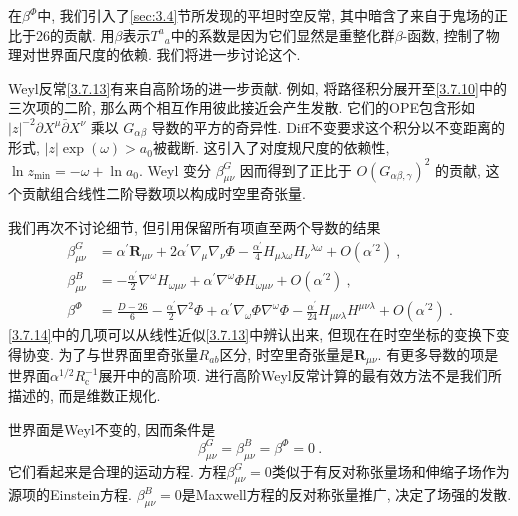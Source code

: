 在$\beta^{\Phi}$中,  我们引入了\ref{sec:3.4}节所发现的平坦时空反常, 其中暗含了来自于鬼场的正比于26的贡献. 用$\beta$表示$T^{a}{ }_{a}$中的系数是因为它们显然是重整化群$\beta$-函数, 控制了物理对世界面尺度的依赖. 我们将进一步讨论这个.

Weyl反常\eqref{3.7.13}有来自高阶场的进一步贡献. 例如, 将路径积分展开至\eqref{3.7.10}中的三次项的二阶, 那么两个相互作用彼此接近会产生发散. 
它们的OPE包含形如 $|z|^{-2} \partial X^{\mu} \bar{\partial} X^{\nu}$ 乘以 $G_{\alpha \beta} $ 导数的平方的奇异性.  Diff不变要求这个积分以不变距离的形式, $|z| \exp (\omega)>a_{0} $被截断. 这引入了对度规尺度的依赖性, $\ln z_{\min }=-\omega+\ln a_{0}$. Weyl 变分 $\beta_{\mu \nu}^{G}$
因而得到了正比于 $O(G_{\alpha \beta, \gamma})^{2}$ 的贡献, 这个贡献组合线性二阶导数项以构成时空里奇张量.

我们再次不讨论细节, 但引用保留所有项直至两个导数的结果
\begin{subequations}\label{3.7.14}
\begin{align}
\beta_{\mu \nu}^{G}&=\alpha^{\prime} \bm{R}_{\mu \nu}+2 \alpha^{\prime} \nabla_{\mu} \nabla_{\nu} \Phi-\frac{\alpha^{\prime}}{4} H_{\mu \lambda \omega} H_{\nu}{}^{\lambda \omega}+O(\alpha^{\prime 2}) \:, \label{3.7.14a} \\
\beta_{\mu \nu}^{B}&=-\frac{\alpha^{\prime}}{2} \nabla^{\omega} H_{\omega \mu \nu}+\alpha^{\prime} \nabla^{\omega} \Phi H_{\omega \mu \nu}+O(\alpha^{\prime 2}) \:, \label{3.7.14b} \\
\beta^{\Phi}&=\frac{D-26}{6}-\frac{\alpha^{\prime}}{2} \nabla^{2} \Phi+\alpha^{\prime} \nabla_{\omega} \Phi \nabla^{\omega} \Phi-\frac{\alpha^{\prime}}{24} H_{\mu \nu \lambda} H^{\mu \nu \lambda}+O(\alpha^{\prime 2}) \:. \label{3.7.14c} 
\end{align}
\end{subequations}
\eqref{3.7.14}中的几项可以从线性近似\eqref{3.7.13}中辨认出来, 但现在在时空坐标的变换下变得协变. 为了与世界面里奇张量$R_{a b} $区分, 
时空里奇张量是$\bm{R}_{\mu \nu}$. 有更多导数的项是世界面$\alpha^{1 / 2} R_{\mathrm{c}}^{-1}$展开中的高阶项. 
进行高阶Weyl反常计算的最有效方法不是我们所描述的, 而是维数正规化. 

世界面是Weyl不变的, 因而条件是
\begin{equation}
\beta_{\mu \nu}^{G}=\beta_{\mu \nu}^{B}=\beta^{\Phi}=0 \:. \label{3.7.15}
\end{equation}
它们看起来是合理的运动方程. 方程$\beta_{\mu \nu}^{G}=0$类似于有反对称张量场和伸缩子场作为源项的Einstein方程. $\beta_{\mu \nu}^{B}=0$是Maxwell方程的反对称张量推广, 
决定了场强的发散.

